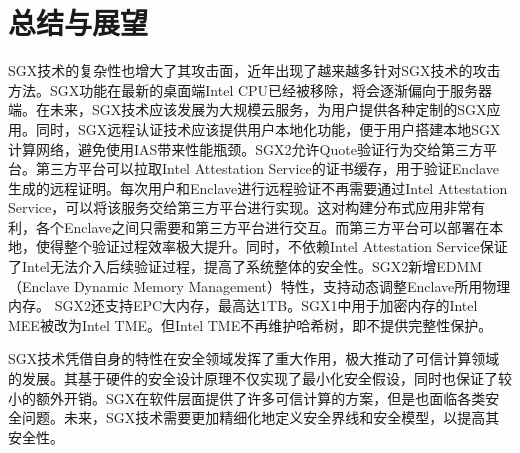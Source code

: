 \documentclass{source/Paper}
\begin{document}
    \section{总结与展望}

        SGX技术的复杂性也增大了其攻击面，近年出现了越来越多针对SGX技术的攻击方法。SGX功能在最新的桌面端Intel CPU已经被移除，将会逐渐偏向于服务器端。在未来，SGX技术应该发展为大规模云服务，为用户提供各种定制的SGX应用。同时，SGX远程认证技术应该提供用户本地化功能，便于用户搭建本地SGX计算网络，避免使用IAS带来性能瓶颈。SGX2允许Quote验证行为交给第三方平台。第三方平台可以拉取Intel Attestation Service的证书缓存，用于验证Enclave生成的远程证明。每次用户和Enclave进行远程验证不再需要通过Intel Attestation Service，可以将该服务交给第三方平台进行实现。这对构建分布式应用非常有利，各个Enclave之间只需要和第三方平台进行交互。而第三方平台可以部署在本地，使得整个验证过程效率极大提升。同时，不依赖Intel Attestation Service保证了Intel无法介入后续验证过程，提高了系统整体的安全性。SGX2新增EDMM（Enclave Dynamic Memory Management）特性，支持动态调整Enclave所用物理内存。
        SGX2还支持EPC大内存，最高达1TB。SGX1中用于加密内存的Intel MEE被改为Intel TME。但Intel TME不再维护哈希树，即不提供完整性保护。

        SGX技术凭借自身的特性在安全领域发挥了重大作用，极大推动了可信计算领域的发展。其基于硬件的安全设计原理不仅实现了最小化安全假设，同时也保证了较小的额外开销。SGX在软件层面提供了许多可信计算的方案，但是也面临各类安全问题。未来，SGX技术需要更加精细化地定义安全界线和安全模型，以提高其安全性。
    
    \newpage
    
    
\end{document}
